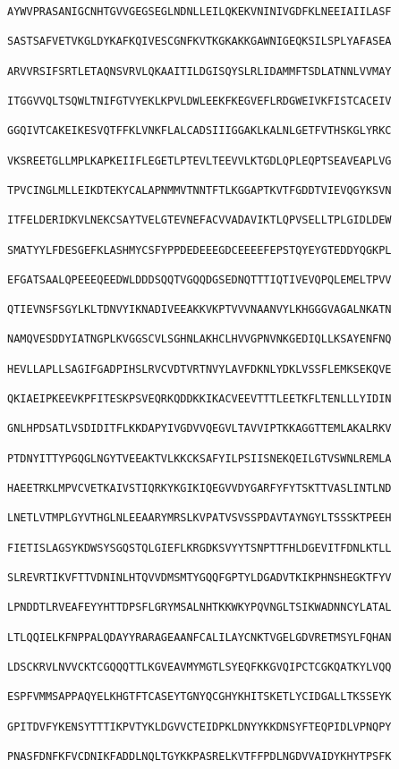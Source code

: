 \documentclass[en,black,10pt,normal]{elegantnote}
\begin{document}
\begin{lstlisting}[frame=single]
AYWVPRASANIGCNHTGVVGEGSEGLNDNLLEILQKEKVNINIVGDFKLNEEIAIILASF

SASTSAFVETVKGLDYKAFKQIVESCGNFKVTKGKAKKGAWNIGEQKSILSPLYAFASEA

ARVVRSIFSRTLETAQNSVRVLQKAAITILDGISQYSLRLIDAMMFTSDLATNNLVVMAY

ITGGVVQLTSQWLTNIFGTVYEKLKPVLDWLEEKFKEGVEFLRDGWEIVKFISTCACEIV

GGQIVTCAKEIKESVQTFFKLVNKFLALCADSIIIGGAKLKALNLGETFVTHSKGLYRKC

VKSREETGLLMPLKAPKEIIFLEGETLPTEVLTEEVVLKTGDLQPLEQPTSEAVEAPLVG

TPVCINGLMLLEIKDTEKYCALAPNMMVTNNTFTLKGGAPTKVTFGDDTVIEVQGYKSVN

ITFELDERIDKVLNEKCSAYTVELGTEVNEFACVVADAVIKTLQPVSELLTPLGIDLDEW

SMATYYLFDESGEFKLASHMYCSFYPPDEDEEEGDCEEEEFEPSTQYEYGTEDDYQGKPL

EFGATSAALQPEEEQEEDWLDDDSQQTVGQQDGSEDNQTTTIQTIVEVQPQLEMELTPVV

QTIEVNSFSGYLKLTDNVYIKNADIVEEAKKVKPTVVVNAANVYLKHGGGVAGALNKATN

NAMQVESDDYIATNGPLKVGGSCVLSGHNLAKHCLHVVGPNVNKGEDIQLLKSAYENFNQ

HEVLLAPLLSAGIFGADPIHSLRVCVDTVRTNVYLAVFDKNLYDKLVSSFLEMKSEKQVE

QKIAEIPKEEVKPFITESKPSVEQRKQDDKKIKACVEEVTTTLEETKFLTENLLLYIDIN

GNLHPDSATLVSDIDITFLKKDAPYIVGDVVQEGVLTAVVIPTKKAGGTTEMLAKALRKV

PTDNYITTYPGQGLNGYTVEEAKTVLKKCKSAFYILPSIISNEKQEILGTVSWNLREMLA

HAEETRKLMPVCVETKAIVSTIQRKYKGIKIQEGVVDYGARFYFYTSKTTVASLINTLND

LNETLVTMPLGYVTHGLNLEEAARYMRSLKVPATVSVSSPDAVTAYNGYLTSSSKTPEEH

FIETISLAGSYKDWSYSGQSTQLGIEFLKRGDKSVYYTSNPTTFHLDGEVITFDNLKTLL

SLREVRTIKVFTTVDNINLHTQVVDMSMTYGQQFGPTYLDGADVTKIKPHNSHEGKTFYV

LPNDDTLRVEAFEYYHTTDPSFLGRYMSALNHTKKWKYPQVNGLTSIKWADNNCYLATAL

LTLQQIELKFNPPALQDAYYRARAGEAANFCALILAYCNKTVGELGDVRETMSYLFQHAN

LDSCKRVLNVVCKTCGQQQTTLKGVEAVMYMGTLSYEQFKKGVQIPCTCGKQATKYLVQQ

ESPFVMMSAPPAQYELKHGTFTCASEYTGNYQCGHYKHITSKETLYCIDGALLTKSSEYK

GPITDVFYKENSYTTTIKPVTYKLDGVVCTEIDPKLDNYYKKDNSYFTEQPIDLVPNQPY

PNASFDNFKFVCDNIKFADDLNQLTGYKKPASRELKVTFFPDLNGDVVAIDYKHYTPSFK


\end{lstlisting}
\end{document}
